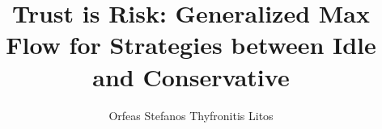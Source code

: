 \title{Trust is Risk: Generalized Max Flow for Strategies between Idle and Conservative}
\author{Orfeas Stefanos Thyfronitis Litos}
\maketitle
